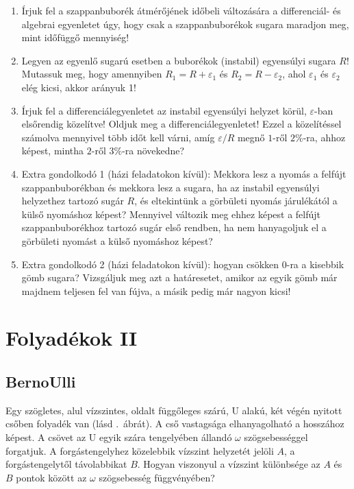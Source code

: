 \documentclass[12pt,a4paper]{scrartcl}
\begin{document}
\begin{enumerate}
\item Írjuk fel a szappanbuborék átmérőjének időbeli változására a differenciál- és algebrai egyenletet úgy, hogy csak a szappanbuborékok sugara maradjon meg, mint időfüggő mennyiség!
\item Legyen az egyenlő sugarú esetben a buborékok (instabil) egyensúlyi sugara $R$! Mutassuk meg, hogy amennyiben $R_1 = R + \varepsilon_1$ és $R_2 = R - \varepsilon_2$, ahol $\varepsilon_1$ és $\varepsilon_2$ elég kicsi, akkor arányuk 1!
\item Írjuk fel a differenciálegyenletet az instabil egyensúlyi helyzet körül, $\varepsilon$-ban elsőrendig közelítve! Oldjuk meg a differenciálegyenletet! Ezzel a közelítéssel számolva mennyivel több időt kell várni, amíg $\varepsilon/R$ megnő $1$-ről $2\%$-ra, ahhoz képest, mintha $2$-ről $3\%$-ra növekedne?
\item Extra gondolkodó 1 (házi feladatokon kívül): Mekkora lesz a nyomás a felfújt szappanbuborékban és mekkora lesz a sugara, ha az instabil egyensúlyi helyzethez tartozó sugár $R$, és eltekintünk a görbületi nyomás járulékától a külső nyomáshoz képest? Mennyivel változik meg ehhez képest a felfújt szappanbuborékhoz tartozó sugár első rendben, ha nem hanyagoljuk el a görbületi nyomást a külső nyomáshoz képest?
\item Extra gondolkodó 2 (házi feladatokon kívül): hogyan csökken 0-ra a kisebbik gömb sugara? Vizsgáljuk meg azt a határesetet, amikor az egyik gömb már majdnem teljesen fel van fújva, a másik pedig már nagyon kicsi!
\end{enumerate}

\section{Folyadékok II}
\subsection{BernoUlli}
Egy szögletes, alul vízszintes, oldalt függőleges szárú, U alakú, két végén nyitott csőben folyadék van (lásd .\ ábrát). A cső vastagsága elhanyagolható a hosszához képest. A csövet az U egyik szára tengelyében állandó $\omega$ szögsebességgel forgatjuk. A forgástengelyhez közelebbik vízszint helyzetét jelöli $A$, a forgástengelytől távolabbikat $B$. Hogyan viszonyul a vízszint különbsége az $A$ és $B$ pontok között az $\omega$ szögsebesség függvényében?
\end{document}
